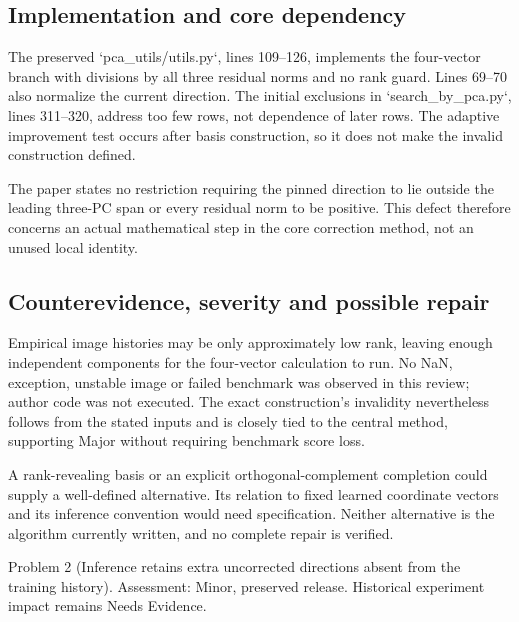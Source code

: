 \documentclass[10pt]{article}
\begin{document}
\subsection*{Implementation and core dependency}
The preserved `pca\_utils/utils.py`, lines 109–126, implements the four-vector branch with divisions by all three residual norms and no rank guard. Lines 69–70 also normalize the current direction. The initial exclusions in `search\_by\_pca.py`, lines 311–320, address too few rows, not dependence of later rows. The adaptive improvement test occurs after basis construction, so it does not make the invalid construction defined.\par
The paper states no restriction requiring the pinned direction to lie outside the leading three-PC span or every residual norm to be positive. This defect therefore concerns an actual mathematical step in the core correction method, not an unused local identity.\par
\subsection*{Counterevidence, severity and possible repair}
Empirical image histories may be only approximately low rank, leaving enough independent components for the four-vector calculation to run. No NaN, exception, unstable image or failed benchmark was observed in this review; author code was not executed. The exact construction’s invalidity nevertheless follows from the stated inputs and is closely tied to the central method, supporting Major without requiring benchmark score loss.\par
A rank-revealing basis or an explicit orthogonal-complement completion could supply a well-defined alternative. Its relation to fixed learned coordinate vectors and its inference convention would need specification. Neither alternative is the algorithm currently written, and no complete repair is verified.\par
Problem 2 (Inference retains extra uncorrected directions absent from the training history).  Assessment: Minor, preserved release. Historical experiment impact remains Needs Evidence.\par
\end{document}
